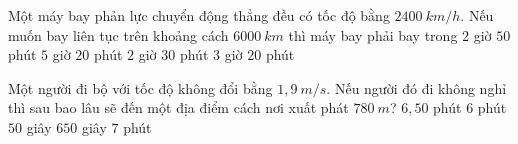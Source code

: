 \begin{vidu}%
Một máy bay phản lực chuyển động thẳng đều có tốc độ bằng $2400\ km/h$. Nếu muốn bay liên tục trên khoảng cách $6000\ km$ thì máy bay phải bay trong 
\choice
{$2$ giờ $50$ phút}
{$5$ giờ $20$ phút}
{\True $2$ giờ $30$ phút}
{$3$ giờ $20$ phút}	
\end{vidu}


\begin{vidu}%
Một người đi bộ với tốc độ không đổi bằng $1,9\  m/s$. Nếu người đó đi không nghỉ thì sau bao lâu sẽ đến một địa điểm cách nơi xuất phát $780\ m$?
\choice
{$6,50$ phút}
{\True $6$ phút $50$ giây}
{$650$ giây}
{$7$ phút}
\end{vidu}

